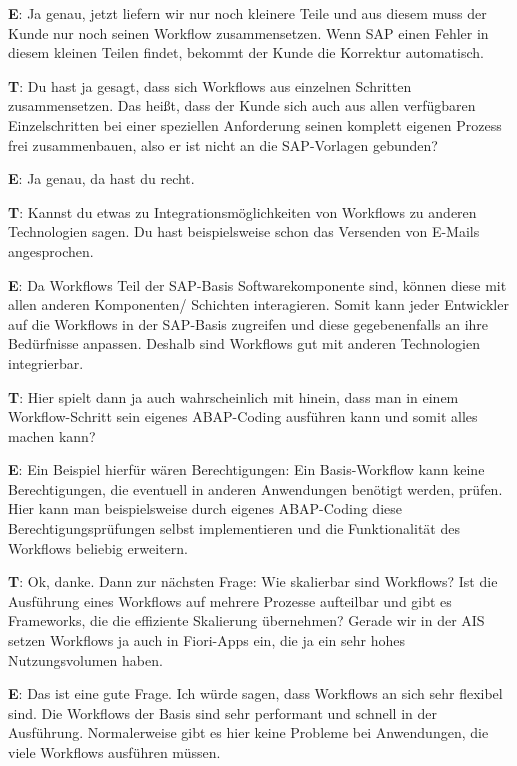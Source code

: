 \begin{list}{X:}{\setlength{\labelsep}{5mm}}
    \item[\textbf{E}:] Ja genau, jetzt liefern wir nur noch kleinere Teile und aus diesem muss der Kunde nur noch seinen Workflow zusammensetzen. Wenn SAP einen Fehler in diesem kleinen Teilen findet, bekommt der Kunde die Korrektur automatisch.
    \item[\textbf{T}:] Du hast ja gesagt, dass sich Workflows aus einzelnen Schritten zusammensetzen. Das hei{\ss}t, dass der Kunde sich auch aus allen verfügbaren Einzelschritten bei einer speziellen Anforderung seinen komplett eigenen Prozess frei zusammenbauen, also er ist nicht an die SAP-Vorlagen gebunden?
    \item[\textbf{E}:] Ja genau, da hast du recht.
    \item[\textbf{T}:] Kannst du etwas zu Integrationsmöglichkeiten von Workflows zu anderen Technologien sagen. Du hast beispielsweise schon das Versenden von E-Mails angesprochen.
    \item[\textbf{E}:] Da Workflows Teil der SAP-Basis Softwarekomponente sind, können diese mit allen anderen Komponenten/ Schichten interagieren. Somit kann jeder Entwickler auf die Workflows in der SAP-Basis zugreifen und diese gegebenenfalls an ihre Bedürfnisse anpassen. Deshalb sind Workflows gut mit anderen Technologien integrierbar.
    \item[\textbf{T}:] Hier spielt dann ja auch wahrscheinlich mit hinein, dass man in einem Workflow-Schritt sein eigenes ABAP-Coding ausführen kann und somit alles machen kann?
    \item[\textbf{E}:] Ein Beispiel hierfür wären Berechtigungen: Ein Basis-Workflow kann keine Berechtigungen, die eventuell in anderen Anwendungen benötigt werden, prüfen. Hier kann man beispielsweise durch eigenes ABAP-Coding diese Berechtigungsprüfungen selbst implementieren und die Funktionalität des Workflows beliebig erweitern.
    \item[\textbf{T}:] Ok, danke. Dann zur nächsten Frage: Wie skalierbar sind Workflows? Ist die Ausführung eines Workflows auf mehrere Prozesse aufteilbar und gibt es Frameworks, die die effiziente Skalierung übernehmen? Gerade wir in der AIS setzen Workflows ja auch in Fiori-Apps ein, die ja ein sehr hohes Nutzungsvolumen haben.
    \item[\textbf{E}:] Das ist eine gute Frage. Ich würde sagen, dass Workflows an sich sehr flexibel sind. Die Workflows der Basis sind sehr performant und schnell in der Ausführung. Normalerweise gibt es hier keine Probleme bei Anwendungen, die viele Workflows ausführen müssen.

\end{list}
